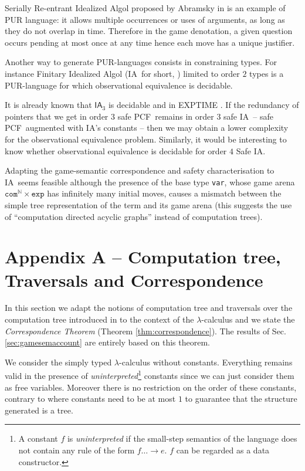 \documentclass{llncs}
\newcommand\nat{\mathbb{N}}
\newcommand\ialgol{\textsf{IA}}
\newcommand\iacom{\texttt{com}}
\newcommand\iaexp{\texttt{exp}}
\newcommand\iavar{\texttt{var}}
\newcommand\pcf{\textsf{PCF}}
\begin{document}
Serially Re-entrant Idealized Algol proposed by Abramsky  in \cite{abramsky:mchecking_ia} is an example of PUR language: it allows multiple occurrences or uses of arguments, as long as they do not overlap in time. Therefore in the game denotation, a given question occurs pending at most once at any time hence each move has a unique justifier.

Another way to generate PUR-languages consists in constraining types. For instance Finitary Idealized Algol (\ialgol\ for short, \cite{Reynolds81}) limited to order $2$ types is a PUR-language for which
observational equivalence is decidable.

It is already known that $\ialgol_3$ is decidable and in EXPTIME \cite{DBLP:conf/fossacs/MurawskiW05}. 
If the redundancy of pointers that we get in order $3$ safe \pcf\ remains in order $3$ safe \ialgol\ -- safe \pcf\ augmented with \ialgol's constants -- then we may obtain a lower complexity for the observational equivalence problem.
Similarly, it would be interesting to know whether observational equivalence is decidable for order $4$ Safe \ialgol.

Adapting the game-semantic correspondence and safety characterisation to \ialgol\ seems feasible although the presence of the base type \iavar, whose game arena $\iacom^{\nat} \times \iaexp$ has infinitely many initial moves, causes a mismatch between the simple tree representation of the term and its game arena (this suggests the use of ``computation directed acyclic graphs'' instead of computation trees). 





\section*{Appendix A -- Computation tree, Traversals and Correspondence}
\label{sec:correspondence}

In this section we adapt the notions of computation tree and
traversals over the computation tree introduced in \cite{OngLics2006} to the context of the $\lambda$-calculus
and we state the \emph{Correspondence Theorem} (Theorem \ref{thm:correspondence}).
The results of Sec. \ref{sec:gamesemaccount} are entirely based on this theorem.

We consider the simply typed $\lambda$-calculus without constants. Everything remains valid in the presence of
\emph{uninterpreted}\footnote{A constant $f$ is \emph{uninterpreted}
if the small-step semantics of the language does not contain any rule of the form $f \dots \rightarrow e$. $f$ can be regarded as a data constructor.}
constants since we can just consider them as free variables. Moreover there is no restriction on the order of these constants, contrary to \cite{OngLics2006} where constants need to be at most $1$ to guarantee that the structure generated is a tree.
\end{document}
